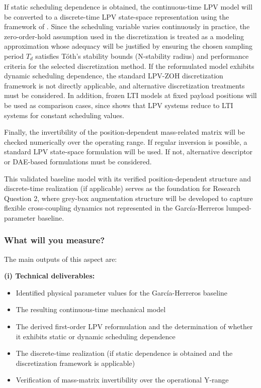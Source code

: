 If static scheduling dependence is obtained, the continuous-time LPV model will be converted to a discrete-time LPV state-space representation using the framework of \citet{toth2010discretization}. Since the scheduling variable varies continuously in practice, the zero-order-hold assumption used in the discretization is treated as a modeling approximation whose adequacy will be justified by ensuring the chosen sampling period $T_d$ satisfies Tóth's stability bounds (N-stability radius) and performance criteria for the selected discretization method. If the reformulated model exhibits dynamic scheduling dependence, the standard LPV-ZOH discretization framework is not directly applicable, and alternative discretization treatments must be considered. In addition, frozen LTI models at fixed payload positions will be used as comparison cases, since \citet{toth2010modeling} shows that LPV systems reduce to LTI systems for constant scheduling values.

Finally, the invertibility of the position-dependent mass-related matrix will be checked numerically over the operating range. If regular inversion is possible, a standard LPV state-space formulation will be used. If not, alternative descriptor or DAE-based formulations must be considered.

This validated baseline model with its verified position-dependent structure and discrete-time realization (if applicable) serves as the foundation for Research Question 2, where grey-box augmentation structure will be developed to capture flexible cross-coupling dynamics not represented in the García-Herreros lumped-parameter baseline.

\subsubsection{What will you measure?}

The main outputs of this aspect are:

\textbf{(i) Technical deliverables:}
\begin{itemize}
    \item Identified physical parameter values for the García-Herreros baseline
    \item The resulting continuous-time mechanical model
    \item The derived first-order LPV reformulation and the determination of whether it exhibits static or dynamic scheduling dependence
    \item The discrete-time realization (if static dependence is obtained and the discretization framework is applicable)
    \item Verification of mass-matrix invertibility over the operational Y-range
\end{itemize}

